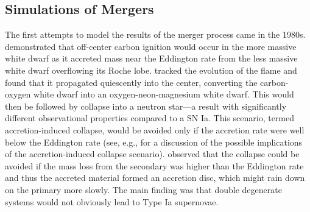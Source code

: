 \documentclass[12pt]{article}
\begin{document}
\subsection{Simulations of Mergers}
\label{sec:merger_simulations}

The first attempts to model the results of the merger process came in the
1980s. \cite{nomotoiben:1985} demonstrated that off-center carbon
ignition would occur in the more massive white dwarf as it accreted
mass near the Eddington rate from the less massive white dwarf
overflowing its Roche lobe. \cite{saionomoto:1985} tracked the
evolution of the flame and found that it propagated quiescently into
the center, converting the carbon-oxygen white dwarf into an
oxygen-neon-magnesium white dwarf. This would then be followed by
collapse into a neutron star---a result with significantly different
observational properties compared to a SN Ia. This scenario, termed
accretion-induced collapse, would be avoided only if the accretion
rate were well below the Eddington rate (see, e.g., \citealt{fryer:1999}
for a discussion of the possible implications of the accretion-induced
collapse scenario). \cite{tutukov-yungelson:1979}
observed that the collapse could be avoided if the mass loss from the secondary
was higher than the Eddington rate and thus the accreted material
formed an accretion disc, which might rain down on the primary more
slowly. The main finding was that double degenerate systems would not
obviously lead to Type Ia supernovae.
\end{document}

